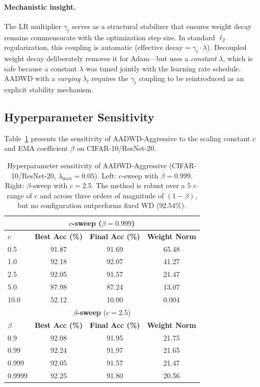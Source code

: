 \documentclass{article}
\begin{document}
\paragraph{Mechanistic insight.}
The LR multiplier $\gamma_t$ serves as a structural stabilizer that ensures weight
decay remains commensurate with the optimization step size.
In standard $\ell_2$ regularization, this coupling is automatic
($\text{effective decay} = \gamma_t \cdot \lambda$).
Decoupled weight decay \citep{loshchilov2019decoupled} deliberately removes it for
Adam---but uses a \emph{constant} $\lambda$, which is safe because a constant
$\lambda$ was tuned jointly with the learning rate schedule.
AADWD with a \emph{varying} $\lambda_t$ requires the $\gamma_t$ coupling to be
reintroduced as an explicit stability mechanism.

\subsection{Hyperparameter Sensitivity}
\label{sec:sensitivity}

Table~\ref{tab:sensitivity} presents the sensitivity of AADWD-Aggressive to the
scaling constant $c$ and EMA coefficient $\beta$ on CIFAR-10/ResNet-20.

\begin{table}[t]
  \centering
  \caption{Hyperparameter sensitivity of AADWD-Aggressive
           (CIFAR-10/ResNet-20, $\lambda_{\max} = 0.05$).
           Left: $c$-sweep with $\beta = 0.999$.
           Right: $\beta$-sweep with $c = 2.5$.
           The method is robust over a $5\times$ range of $c$ and across three orders
           of magnitude of $(1-\beta)$, but no configuration outperforms fixed WD
           ($92.54\%$).}
  \label{tab:sensitivity}
  \small
  \begin{tabular}{lccc}
    \toprule
    \multicolumn{4}{c}{\textbf{$c$-sweep} ($\beta = 0.999$)} \\
    \midrule
    $c$ & \textbf{Best Acc (\%)} & \textbf{Final Acc (\%)} & \textbf{Weight Norm} \\
    \midrule
    0.5  & 91.87 & 91.69 & 65.48 \\
    1.0  & 92.18 & 92.07 & 41.27 \\
    2.5  & 92.05 & 91.57 & 21.47 \\
    5.0  & 87.98 & 87.24 & 13.07 \\
    10.0 & 52.12 & 10.00 & 0.004 \\
    \midrule
    \multicolumn{4}{c}{\textbf{$\beta$-sweep} ($c = 2.5$)} \\
    \midrule
    $\beta$ & \textbf{Best Acc (\%)} & \textbf{Final Acc (\%)} & \textbf{Weight Norm} \\
    \midrule
    0.9    & 92.08 & 91.95 & 21.75 \\
    0.99   & 92.24 & 91.97 & 21.65 \\
    0.999  & 92.05 & 91.57 & 21.47 \\
    0.9999 & 92.25 & 91.80 & 20.56 \\
    \bottomrule
  \end{tabular}
\end{table}
\end{document}
